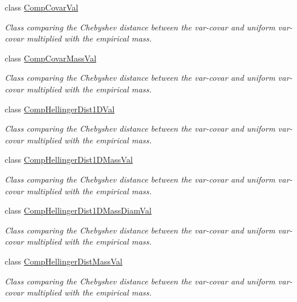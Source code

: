 \begin{DoxyCompactItemize}
class \hyperlink{classsubpavings_1_1CompCovarVal}{\-Comp\-Covar\-Val}
\begin{DoxyCompactList}\small\item\em \-Class comparing the \-Chebyshev distance between the var-\/covar and uniform var-\/covar multiplied with the empirical mass. \end{DoxyCompactList}\item 
class \hyperlink{classsubpavings_1_1CompCovarMassVal}{\-Comp\-Covar\-Mass\-Val}
\begin{DoxyCompactList}\small\item\em \-Class comparing the \-Chebyshev distance between the var-\/covar and uniform var-\/covar multiplied with the empirical mass. \end{DoxyCompactList}\item 
class \hyperlink{classsubpavings_1_1CompHellingerDist1DVal}{\-Comp\-Hellinger\-Dist1\-D\-Val}
\begin{DoxyCompactList}\small\item\em \-Class comparing the \-Chebyshev distance between the var-\/covar and uniform var-\/covar multiplied with the empirical mass. \end{DoxyCompactList}\item 
class \hyperlink{classsubpavings_1_1CompHellingerDist1DMassVal}{\-Comp\-Hellinger\-Dist1\-D\-Mass\-Val}
\begin{DoxyCompactList}\small\item\em \-Class comparing the \-Chebyshev distance between the var-\/covar and uniform var-\/covar multiplied with the empirical mass. \end{DoxyCompactList}\item 
class \hyperlink{classsubpavings_1_1CompHellingerDist1DMassDiamVal}{\-Comp\-Hellinger\-Dist1\-D\-Mass\-Diam\-Val}
\begin{DoxyCompactList}\small\item\em \-Class comparing the \-Chebyshev distance between the var-\/covar and uniform var-\/covar multiplied with the empirical mass. \end{DoxyCompactList}\item 
class \hyperlink{classsubpavings_1_1CompHellingerDistMassVal}{\-Comp\-Hellinger\-Dist\-Mass\-Val}
\begin{DoxyCompactList}\small\item\em \-Class comparing the \-Chebyshev distance between the var-\/covar and uniform var-\/covar multiplied with the empirical mass. \end{DoxyCompactList}\item 

\end{DoxyCompactItemize}
